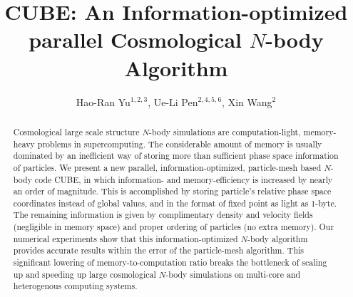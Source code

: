 \documentclass[10pt,twocolumn,preprint]{emulateapj}
\begin{document}
\title{CUBE: An Information-optimized parallel Cosmological $N$-body Algorithm}
\author{
Hao-Ran Yu$^{1,2,3}$,
Ue-Li Pen$^{2,4,5,6}$,
Xin Wang$^{2}$
}


 
\begin{abstract}
Cosmological large scale structure $N$-body simulations are computation-light, memory-heavy problems in supercomputing. The considerable amount of memory is usually dominated by an inefficient way of storing more than sufficient phase space information of particles. We present a new parallel, information-optimized, particle-mesh based $N$-body code CUBE, in which information- and memory-efficiency is increased by nearly an order of magnitude. This is accomplished by storing particle's relative phase space coordinates instead of global values, and in the format of fixed point as light as 1-byte. The remaining information is given by complimentary density and velocity fields (negligible in memory space) and proper ordering of particles (no extra memory). Our numerical experiments show that this information-optimized $N$-body algorithm provides accurate results within the error of the particle-mesh algorithm. This significant lowering of memory-to-computation ratio breaks the bottleneck of scaling up and speeding up large cosmological $N$-body simulations on multi-core and heterogenous computing systems. 

\end{abstract}

\keywords{}

\maketitle
\end{document}
